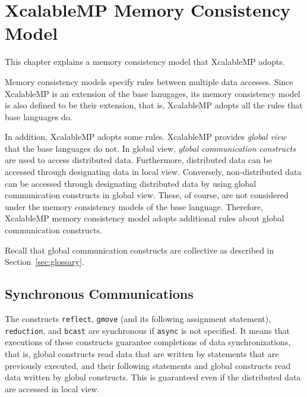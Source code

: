 

\chapter{XcalableMP Memory Consistency Model}



This chapter explains a memory consistency model that XcalableMP adopts.

Memory consistency models specify rules between multiple data
accesses.  Since XcalableMP is an extension of the base lanugages, its
memory consistency model is also defined to be their extension, that
is, XcalableMP adopts all the rules that base languages do.

In addition, XcalableMP adopts some rules.  XcalableMP provides
\emph{global view} that the base languages do not.  In global view,
\emph{global communication constructs} are used to access distributed
data.  Furthermore, distributed data can be accessed through
designating data in local view.  Conversely, non-distributed data can
be accessed through designating distributed data by using global
communication constructs in global view.  These, of course, are not
considered under the memory consistency models of the base language.
Therefore, XcalableMP memory consistency model adopts additional rules
about global communication constructs.

Recall that global communication constructs are collective as
described in Section~\ref{sec:glossary}.

\section{Synchronous Communications}

The constructs \texttt{reflect}, \texttt{gmove} (and its following
assignment statement), \texttt{reduction}, and \texttt{bcast} are
synchronous if \texttt{async} is not specified.  It means that
executions of these constructs guarantee completions of data
synchronizations, that is, global constructs read data that are
written by statements that are previously executed, and their
following statements and global constructs read data written by global
constructs.  This is guaranteed even if the distributed data are
accessed in local view.

